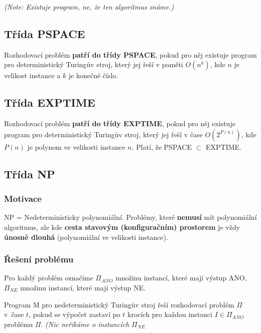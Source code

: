 \vspace{4pt}
\noindent \textit{(Note: Existuje program, ne, že ten algoritmus známe.)}

\subsection{Třída PSPACE}

Rozhodovací problém \textbf{patří do třídy PSPACE}, pokud pro něj existuje program pro deterministický Turingův stroj, který jej řeší v paměti $O(n^k)$, kde $n$ je velikost instance a $k$ je konečné číslo.

\subsection{Třída EXPTIME}

Rozhodovací problém \textbf{patří do třídy EXPTIME}, pokud pro něj existuje program pro deterministický Turingův stroj, který jej řeší v čase $O(2^{P(n)})$, kde $P(n)$ je polynom ve velikosti instance $n$. Platí, že PSPACE $\subset$ EXPTIME.

\subsection{Třída NP}

\subsubsection*{Motivace}

NP = Nedeterministicky polynomiální. Problémy, které \textbf{nemusí} mít polynomiální algoritmus, ale kde \textbf{cesta stavovým (konfiguračním) prostorem} je vždy \textbf{únosně dlouhá} (polynomiální ve velikosti instance).

\subsubsection*{Řešení problému}

Pro každý problém označíme $\Pi_{ANO}$ množinu instancí, které mají výstup ANO, $\Pi_{NE}$ množinu instancí, které mají výstup NE.

\vspace{4pt}
\noindent Program M pro nedeterministický Turingův stroj řeší rozhodovací problém $\Pi$ v~čase $t$, pokud se výpočet zastaví po $t$ krocích pro každou instanci $I \in \Pi_{ANO}$ problému $\Pi$. \textit{(Nic neříkáme o instancích $\Pi_{NE}$}

